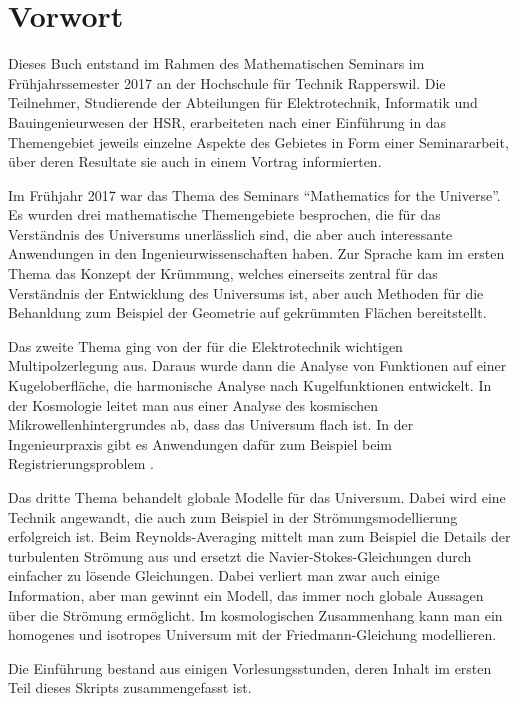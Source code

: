 %
%
%
\chapter*{Vorwort}
\rhead{}
Dieses Buch entstand im Rahmen des Mathematischen Seminars
im Frühjahrssemester 2017 an der Hochschule für Technik Rapperswil.
Die Teilnehmer, Studierende der Abteilungen für Elektrotechnik,
Informatik und Bauingenieurwesen der
HSR, erarbeiteten nach einer Einführung in das Themengebiet jeweils
einzelne Aspekte des Gebietes in Form einer Seminararbeit, über
deren Resultate sie auch in einem Vortrag informierten. 

Im Frühjahr 2017 war das Thema des Seminars ``Mathematics for
the Universe''.
Es wurden drei mathematische Themengebiete besprochen, die für
das Verständnis des Universums unerlässlich sind, die aber auch
interessante Anwendungen in den Ingenieurwissenschaften haben.
Zur Sprache kam im ersten Thema das Konzept der Krümmung,
welches einerseits zentral für das Verständnis der Entwicklung
des Universums ist, aber auch Methoden für die Behanldung 
zum Beispiel der Geometrie auf gekrümmten Flächen bereitstellt.

Das zweite Thema ging von der für die Elektrotechnik wichtigen
Multipolzerlegung aus.
Daraus wurde dann die Analyse von Funktionen auf einer Kugeloberfläche,
die harmonische Analyse nach Kugelfunktionen entwickelt.
In der Kosmologie leitet man aus einer Analyse des kosmischen
Mikrowellenhintergrundes ab, dass das Universum flach ist.
In der Ingenieurpraxis gibt es Anwendungen dafür zum Beispiel
beim Registrierungsproblem \cite{skript:tabea}.

Das dritte Thema behandelt globale Modelle für das Universum.
Dabei wird eine Technik angewandt, die auch zum Beispiel in der
Strömungsmodellierung erfolgreich ist.
Beim Reynolds-Averaging mittelt man zum Beispiel die Details
der turbulenten Strömung aus und ersetzt die Navier-Stokes-Gleichungen
durch einfacher zu lösende Gleichungen.
Dabei verliert man zwar auch einige Information, aber man gewinnt
ein Modell, das immer noch globale Aussagen über die Strömung
ermöglicht.
Im kosmologischen Zusammenhang kann man ein homogenes und isotropes
Universum mit der Friedmann-Gleichung modellieren.

Die Einführung bestand aus einigen Vorlesungsstunden, deren
Inhalt im ersten Teil dieses Skripts zusammengefasst ist.  

